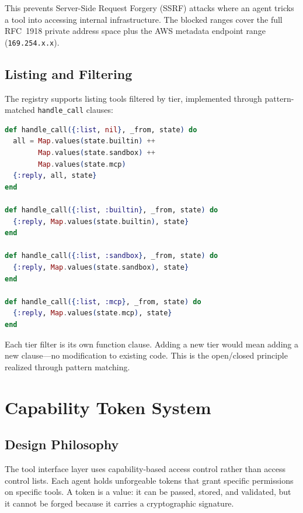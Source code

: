 \documentclass[12pt,a4paper]{article}
\theoremstyle{plain}
\theoremstyle{definition}
\begin{document}
This prevents Server-Side Request Forgery (SSRF) attacks where an agent tricks a tool into accessing internal infrastructure. The blocked ranges cover the full RFC~1918 private address space plus the AWS metadata endpoint range (\texttt{169.254.x.x}).

\subsection{Listing and Filtering}

The registry supports listing tools filtered by tier, implemented through pattern-matched \texttt{handle\_call} clauses:

\begin{lstlisting}[language=elixir, caption={Filtered tool listing.}, label={lst:list}]
def handle_call({:list, nil}, _from, state) do
  all = Map.values(state.builtin) ++
        Map.values(state.sandbox) ++
        Map.values(state.mcp)
  {:reply, all, state}
end

def handle_call({:list, :builtin}, _from, state) do
  {:reply, Map.values(state.builtin), state}
end

def handle_call({:list, :sandbox}, _from, state) do
  {:reply, Map.values(state.sandbox), state}
end

def handle_call({:list, :mcp}, _from, state) do
  {:reply, Map.values(state.mcp), state}
end
\end{lstlisting}

Each tier filter is its own function clause. Adding a new tier would mean adding a new clause---no modification to existing code. This is the open/closed principle realized through pattern matching.


\section{Capability Token System}
\label{sec:capabilities}

\subsection{Design Philosophy}

The tool interface layer uses capability-based access control rather than access control lists. Each agent holds unforgeable tokens that grant specific permissions on specific tools. A token is a value: it can be passed, stored, and validated, but it cannot be forged because it carries a cryptographic signature.
\end{document}
